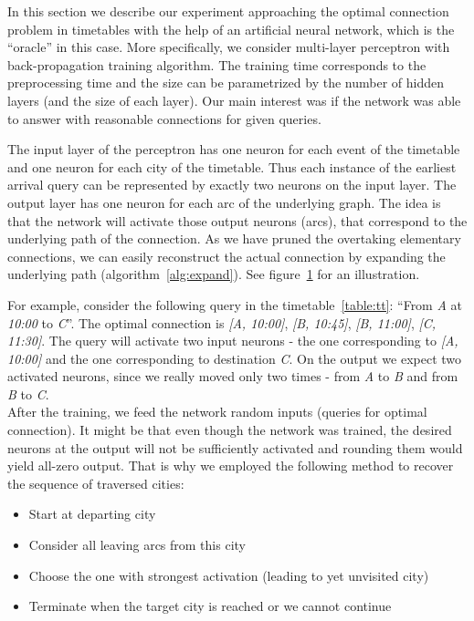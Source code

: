 In this section we describe our experiment approaching the optimal connection problem in timetables with the help of an artificial neural network, which is the ``oracle'' in this case. More specifically, we consider multi-layer perceptron with back-propagation training algorithm. The training time corresponds to the preprocessing time and the size can be parametrized by the number of hidden layers (and the size of each layer). Our main interest was if the network was able to answer with reasonable connections for given queries.

The input layer of the perceptron has one neuron for each event of the timetable and one neuron for each city of the timetable. Thus each instance of the earliest arrival query can be represented by exactly two neurons on the input layer. The output layer has one neuron for each arc of the underlying graph. The idea is that the network will activate those output neurons (arcs), that correspond to the underlying path of the connection. As we have pruned the overtaking elementary connections, we can easily reconstruct the actual connection by expanding the underlying path (algorithm~\ref{alg:expand}). See figure~\ref{fig:neural} for an illustration. \\
	
	\begin{figure}[h]
		\begin{center}
        \end{center}
		\caption{\label{fig:neural} }
	\end{figure}		
	
\noindent For example, consider the following query in the timetable~\ref{table:tt}: ``From \textit{A} at \textit{10:00} to \textit{C}''. The optimal connection is \textit{[A, 10:00]}, \textit{[B, 10:45]}, \textit{[B, 11:00]}, \textit{[C, 11:30]}. The query will activate two input neurons - the one corresponding to \textit{[A, 10:00]} and the one corresponding to destination \textit{C}. On the output we expect two activated neurons, since we really moved only two times - from \textit{A} to \textit{B} and from \textit{B} to \textit{C}. \\
		
\noindent After the training, we feed the network random inputs (queries for optimal connection). It might be that even though the network was trained, the desired neurons at the output will not be sufficiently activated and rounding them would yield all-zero output. That is why we employed the following method to recover the sequence of traversed cities:
\begin{itemize}
	\item Start at departing city
	\item Consider all leaving arcs from this city
	\item Choose the one with strongest activation (leading to yet unvisited city)
	\item Terminate when the target city is reached or we cannot continue
\end{itemize}
\hspace{\fill}

